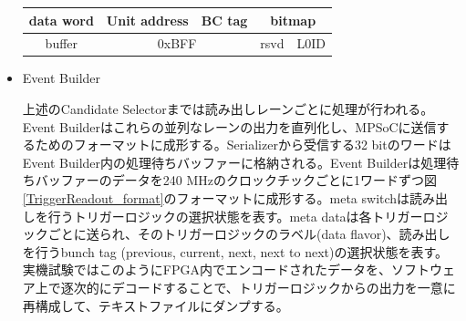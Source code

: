 \begin{itemize}
\begin{table}
{\begin{tabular}{|c|cccccccccccccccccccccccccccccccc|}
        data word & \multicolumn{6}{c|}{Unit address}                                                                                                                         & \multicolumn{2}{c|}{BC tag}                       & \multicolumn{24}{c|}{bitmap}                                                                                                                                                                                                                                                                                                                                                                                                                                                                                                                                                                                   \\ \hline
        buffer    & \multicolumn{12}{c|}{0xBFF}                                                                                                                                                                                                                                                                                           & \multicolumn{9}{c|}{rsvd}                                                                                                                                                                                                               & \multicolumn{11}{c|}{L0ID}                                                                                                                                                                                                                                   \\ \hline
        \end{tabular}
        }
    \end{table}

    \item Event Builder　　
    \par
    上述のCandidate Selectorまでは読み出しレーンごとに処理が行われる。Event Builderはこれらの並列なレーンの出力を直列化し、MPSoCに送信するためのフォーマットに成形する。Serializerから受信する32 bitのワードはEvent Builder内の処理待ちバッファーに格納される。Event Builderは処理待ちバッファーのデータを240 MHzのクロックチックごとに1ワードずつ図\ref{TriggerReadout_format}のフォーマットに成形する。meta switchは読み出しを行うトリガーロジックの選択状態を表す。meta dataは各トリガーロジックごとに送られ、そのトリガーロジックのラベル(data flavor)、読み出しを行うbunch tag (previous, current, next, next to next)の選択状態を表す。
    実機試験ではこのようにFPGA内でエンコードされたデータを、ソフトウェア上で逐次的にデコードすることで、トリガーロジックからの出力を一意に再構成して、テキストファイルにダンプする。


\end{itemize}
